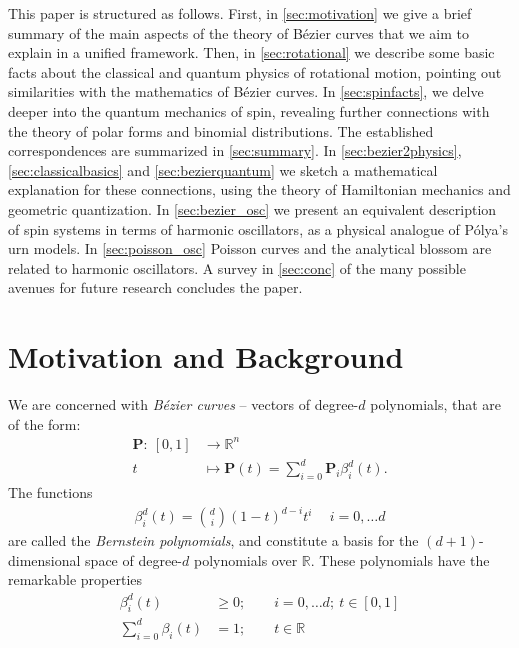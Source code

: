 \documentclass[12pt,final,3p]{elsarticle}
\begin{document}
This paper is structured as follows. First, in \autoref{sec:motivation} we give a brief summary of the main aspects of the theory of B\'{e}zier curves that we aim to explain in a unified framework. Then, in \autoref{sec:rotational} we describe some basic facts about the classical and quantum physics of rotational motion, pointing out similarities with the mathematics of B\'{e}zier curves. In \autoref{sec:spinfacts}, we delve deeper into the quantum mechanics of spin, revealing further connections with the theory of polar forms and binomial distributions. The established correspondences are summarized in \autoref{sec:summary}. In \autoref{sec:bezier2physics}, \autoref{sec:classicalbasics} and \autoref{sec:bezierquantum} we sketch a mathematical explanation for these connections, using the theory of Hamiltonian mechanics and geometric quantization. In \autoref{sec:bezier_osc} we present an equivalent description of spin systems in terms of harmonic oscillators, as a physical analogue of P\'{o}lya's urn models. In \autoref{sec:poisson_osc} Poisson curves and the analytical blossom are related to harmonic oscillators. A survey in \autoref{sec:conc} of the many possible avenues for future research concludes the paper.

\section{Motivation and Background}\label{sec:motivation}
We are concerned with \emph{B\'{e}zier curves} -- vectors of degree-$d$ polynomials, that are of the form:
\begin{align}
\mathbf{P}:\ \left[ 0,1 \right]  & \longrightarrow \mathbb{R}^{n}\\
t &\longmapsto \mathbf{P}(t) = \sum_{i = 0}^{d}\mathbf{P}_{i}\beta_{i}^{d}(t).
\end{align}
The functions
\begin{align}
\beta_{i}^{d}(t) = {d \choose i}(1-t)^{d-i}t^{i} &\ \  i = 0, \ldots d
\end{align}
are called the \emph{Bernstein polynomials}, and constitute a basis for the $(d+1)$-dimensional space of degree-$d$ polynomials over $\mathbb{R}$. These polynomials have the remarkable properties
\begin{align}
\beta_{i}^{d}(t) &\geq 0;\qquad i = 0, \ldots d;\ t \in \left[0,1\right] \tag{Positivity}  \\
\sum_{i = 0}^{d}\beta_{i}(t) &= 1;\qquad t \in \mathbb{R} \tag{Partition of Unity}
\end{align}
\end{document}
